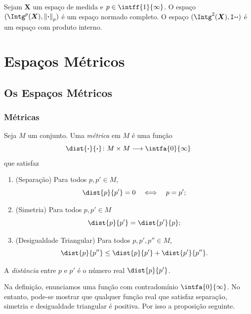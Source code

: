 \begin{prop}
Sejam $\bm X$ um espaço de medida e $p \in \intff{1}{\infty}$. O espaço $(\Intg^p(\bm X),\nor{\var}_p)$ é um espaço normado completo. O espaço $(\Intg^2(\bm X),\inte{\var}{\var})$ é um espaço com produto interno.
\end{prop}



\chapter{Espaços Métricos}

\section{Os Espaços Métricos}

\subsection{Métricas}

\begin{defi}
Seja $M$ um conjunto. Uma \emph{métrica} em $M$ é uma função
	\begin{equation*}
	\dist{\var}{\var}\colon M \times M \to \intfa{0}{\infty}
	\end{equation*}
que satisfaz
	\begin{enumerate}
	\item (Separação) Para todos $p,p' \in M$,
		\begin{equation*}
		\dist{p}{p'} = 0 \sse p = p';
		\end{equation*}
	\item (Simetria) Para todos $p,p' \in M$
		\begin{equation*}
		\dist{p}{p'} = \dist{p'}{p};
		\end{equation*}
	\item (Desigualdade Triangular) Para todos $p,p',p'' \in M$,
		\begin{equation*}
		\dist{p}{p''} \leq \dist{p}{p'} + \dist{p'}{p''}.
		\end{equation*}
	\end{enumerate}
A \emph{distância} entre $p$ e $p'$ é o número real $\dist{p}{p'}$.
\end{defi}

Na definição, enunciamos uma função com contradomínio $\intfa{0}{\infty}$. No entanto, pode-se mostrar que qualquer função real que satisfaz separação, simetria e desigualdade triangular é positiva. Por isso a proposição seguinte.

